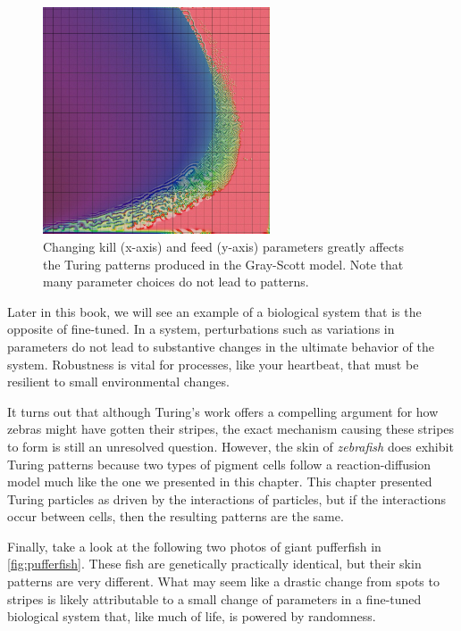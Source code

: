 \begin{figure}[h]
\centering
\mySfFamily
\includegraphics[width = 0.6\textwidth]{../images/xmorphia-parameter-map.jpg}
\caption{Changing kill (x-axis) and feed (y-axis) parameters greatly affects the Turing patterns produced in the Gray-Scott model. Note that many parameter choices do not lead to patterns.}
\label{fig:xmorphia-parameter-map}
\end{figure}

Later in this book, we will see an example of a biological system that is the opposite of fine-tuned. In a  system, perturbations such as variations in parameters do not lead to substantive changes in the ultimate behavior of the system. Robustness is vital for processes, like your heartbeat, that must be resilient to small environmental changes.

It turns out that although Turing's work offers a compelling argument for how zebras might have gotten their stripes, the exact mechanism causing these stripes to form is still an unresolved question. However, the skin of \textit{zebrafish} does exhibit Turing patterns because two types of pigment cells follow a reaction-diffusion model much like the one we presented in this chapter. This chapter presented Turing particles as driven by the interactions of particles, but if the interactions occur between cells, then the resulting patterns are the same.

Finally, take a look at the following two photos of giant pufferfish in \autoref{fig:pufferfish}. These fish are genetically practically identical, but their skin patterns are very different. What may seem like a drastic change from spots to stripes is likely attributable to a small change of parameters in a fine-tuned biological system that, like much of life, is powered by randomness.\\

